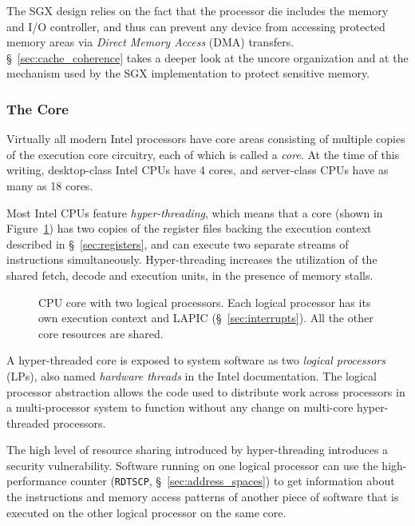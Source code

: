 The SGX design relies on the fact that the processor die includes the memory
and I/O controller, and thus can prevent any device from accessing protected
memory areas via \textit{Direct Memory Access} (DMA) transfers.
\S~\ref{sec:cache_coherence} takes a deeper look at the uncore organization and
at the mechanism used by the SGX implementation to protect sensitive memory.


\subsubsection{The Core}
\label{sec:cpu_core}

Virtually all modern Intel processors have core areas consisting of multiple
copies of the execution core circuitry, each of which is called a
\textit{core}.  At the time of this writing, desktop-class Intel CPUs have 4
cores, and server-class CPUs have as many as 18 cores.

Most Intel CPUs feature \textit{hyper-threading}, which means that a core
(shown in Figure~\ref{fig:cpu_core}) has two copies of the register files
backing the execution context described in \S~\ref{sec:registers}, and can
execute two separate streams of instructions simultaneously. Hyper-threading
increases the utilization of the shared fetch, decode and execution units, in
the presence of memory stalls.

\begin{figure}[hbt]
  \caption{
    CPU core with two logical processors. Each logical processor has its own
    execution context and LAPIC (\S~\ref{sec:interrupts}). All the other core
    resources are shared.
  }
  \label{fig:cpu_core}
\end{figure}

A hyper-threaded core is exposed to system software as two \textit{logical
processors} (LPs), also named \textit{hardware threads} in the Intel
documentation.  The logical processor abstraction allows the code used to
distribute work across processors in a multi-processor system to function
without any change on multi-core hyper-threaded processors.

The high level of resource sharing introduced by hyper-threading introduces a
security vulnerability. Software running on one logical processor can use the
high-performance counter (\texttt{RDTSCP}, \S~\ref{sec:address_spaces})
\cite{petters1999making} to get information about the instructions and memory
access patterns of another piece of software that is executed on the other
logical processor on the same core.
